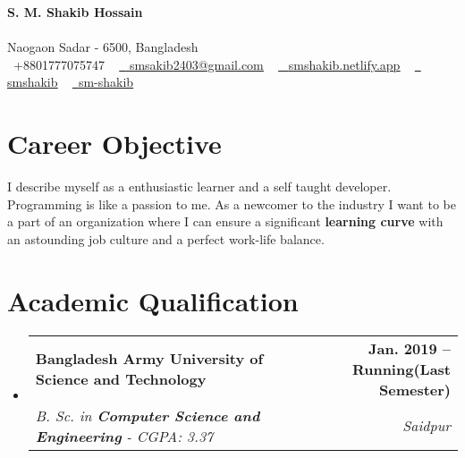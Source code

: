\documentclass[letterpaper,11pt]{article}
\makeatletter
\newcommand{\resumeSubheading}[4]{
  \vspace{-2pt}\item
    \begin{tabular*}{1.0\textwidth}[t]{l@{\extracolsep{\fill}}r}
      \textbf{#1} & \textbf{\small #2} \\
      \textit{\small#3} & \textit{\small #4} \\
    \end{tabular*}\vspace{-7pt}
}
\newcommand{\resumeSubHeadingListStart}{\begin{itemize}[leftmargin=0.0in, label={}]}
\newcommand{\resumeSubHeadingListEnd}{\end{itemize}}
\makeatother
\begin{document}

\begin{center}
    {\Huge \textbf{S. M. Shakib Hossain}} \\ \vspace{1pt}
   \\Naogaon Sadar - 6500, Bangladesh \\ \vspace{1pt}
    \small \raisebox{-0.1\height}\faPhone\ +8801777075747 ~ \href{mailto:smsakib2403@gmail.com}{\raisebox{-0.2\height}\faEnvelope\  { \underline{smsakib2403@gmail.com}}} ~ 
    \href{https://smshakib.netlify.app}{\raisebox{-0.2\height}\faHome\   { \underline{smshakib.netlify.app}}} ~
    \href{https://www.linkedin.com/in/smshakib/}{\raisebox{-0.2\height}\faLinkedin\ { \underline{smshakib}}} ~
    \href{https://github.com/sm-shakib}{\raisebox{-0.2\height}\faGithub\   \underline{sm-shakib}}
    \vspace{2pt}
\end{center}


\section{Career Objective}
\resumeSubHeadingListStart
      {I describe myself as a enthusiastic learner and a self taught developer. Programming is like a passion to me. As a newcomer to the industry I want to be a part of an organization where I can ensure a significant \textbf{learning curve} with an astounding job culture and a perfect work-life balance.}
\resumeSubHeadingListEnd 
 \vspace{-16pt}

\section{Academic Qualification}
  \resumeSubHeadingListStart
    \resumeSubheading
      {Bangladesh Army University of Science and Technology}{Jan. 2019 -- Running(Last Semester)}
      {B. Sc. in \textbf{Computer Science and Engineering} - CGPA: 3.37}{Saidpur}
  \resumeSubHeadingListEnd
\end{document}
